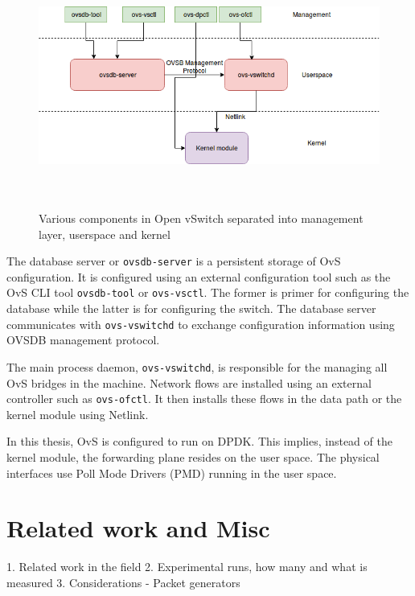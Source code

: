 \documentclass[english, 12pt, a4paper, elec, utf8, a-1b, online]{aaltothesis}
\begin{document}
\begin{figure}[htb]
\begin{center}
\includegraphics[height=8cm, width=15cm]{pics/ovs.png}
\end{center}
\caption{Various components in Open vSwitch separated into management layer, userspace and kernel}
\label{fig-ovs}
\end{figure}

The database server or \lstinline{ovsdb-server} is a persistent storage of OvS configuration. It is configured using an external configuration tool such as the OvS CLI tool \lstinline{ovsdb-tool} or \lstinline{ovs-vsctl}. The former is primer for configuring the database while the latter is for configuring the switch. The database server communicates with \lstinline{ovs-vswitchd} to exchange configuration information using OVSDB management protocol.

The main process daemon, \lstinline{ovs-vswitchd}, is responsible for the managing all OvS bridges in the machine. Network flows are installed using an external controller such as \lstinline{ovs-ofctl}. It then installs these flows in the data path or the kernel module using Netlink.

In this thesis, OvS is configured to run on DPDK. This implies, instead of the kernel module, the forwarding plane resides on the user space. The physical interfaces use Poll Mode Drivers (PMD) running in the user space. 

\clearpage
\section{Related work and Misc}
1. Related work in the field
2. Experimental runs, how many and what is measured
3. Considerations - Packet generators
\end{document}
